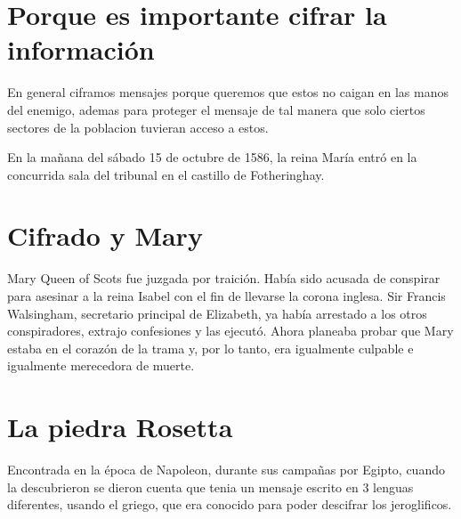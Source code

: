 \documentclass[12pt, fleqn]{report}                             %
\theoremstyle{break}                                            %
\begin{document}
        \clearpage
        \section{Porque es importante cifrar la información}

            
            En general ciframos mensajes porque queremos que estos no caigan en las manos
            del enemigo, ademas para proteger el mensaje de tal manera que solo ciertos sectores
            de la poblacion tuvieran acceso a estos.

            En la mañana del sábado 15 de octubre de 1586, la reina María entró en la concurrida sala
            del tribunal en el castillo de Fotheringhay. 

        \clearpage
        \section{Cifrado y Mary}

            Mary Queen of Scots fue juzgada por traición. Había sido acusada de conspirar para asesinar a la
            reina Isabel con el fin de llevarse la corona inglesa. Sir Francis Walsingham, secretario
            principal de Elizabeth, ya había arrestado a los otros conspiradores, extrajo confesiones
            y las ejecutó. Ahora planeaba probar que Mary estaba en el corazón de la trama y, por lo
            tanto, era igualmente culpable e igualmente merecedora de muerte.
        
        \clearpage
        \section{La piedra Rosetta}

            Encontrada en la época de Napoleon, durante sus campañas por Egipto, cuando la descubrieron 
            se dieron cuenta que tenia un mensaje escrito en 3 lenguas diferentes, usando el griego, que era
            conocido para poder descifrar los jeroglificos.
            
\end{document}
